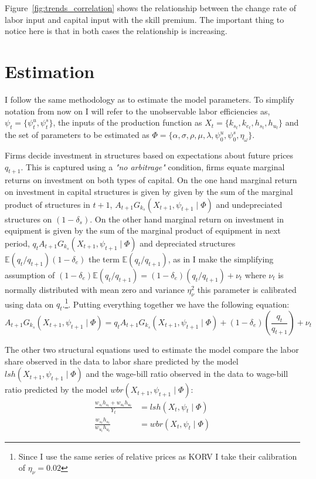 \documentclass[12pt]{article}
\begin{document}
Figure~\ref*{fig:trends_correlation} shows the relationship between the change rate of labor input and capital input with the skill premium. The important thing to notice here is that in both cases the relationship is increasing.


\section{Estimation}
I follow the same methodology as \citep{krusell2000capital} to estimate the model parameters. To simplify notation from now on I will refer to the unobservable labor efficiencies as, $\psi_t = \{\psi^u_t, \psi^s_t\}$, the inputs of the production function as $X_t = \{ k_{s_t} , k_{e_t}, h_{s_t}, h_{u_t}\}$ and the set of parameters to be estimated as $\Phi = \{\alpha, \sigma, \rho, \mu, \lambda, \psi^u_0, \psi^s_0, \eta_\omega \}$. 

Firms decide investment in structures based on expectations about future prices $q_{t+1}$. This is captured using a \textit{"no arbitrage"} condition, firms equate marginal returns on investment on both types of capital. On the one hand marginal return on investment in capital structures is given by given by the sum of the marginal product of structures in $t+1$, $A_{t+1} G_{k_s}(X_{t+1}, \psi_{t+1} \mid \Phi )$ and undepreciated structures on $(1-\delta_s)$. On the other hand marginal return on investment in equipment is given by the sum of the marginal product of equipment in next period, $q_t A_{t+1} G_{k_s}(X_{t+1}, \psi_{t+1} \mid \Phi )$ and depreciated structures $\mathbb{E}(q_t/q_{t+1})(1-\delta_e)$ the term $\mathbb{E}(q_t/q_{t+1})$, as in \citep{krusell2000capital} I make the simplifying assumption of 
$(1-\delta_e)\mathbb{E}(q_t/q_{t+1}) =(1-\delta_e)(q_t/q_{t+1}) + \nu_t$ where $\nu_t$ is normally distributed with mean zero and variance $\eta_\nu^2$ this parameter is calibrated using data on $q_t$.\footnote{Since I use the same series of relative prices as KORV I take their calibration of $\eta_\nu = 0.02$}. Putting everything together we have the following equation:
\begin{equation}\label{eq:no_arbitrage}
 A_{t+1} G_{k_s}(X_{t+1}, \psi_{t+1} \mid \Phi ) = q_t A_{t+1} G_{k_s}(X_{t+1}, \psi_{t+1} \mid \Phi ) + (1-\delta_e)\left(\frac{q_t}{q_{t+1}}\right) + \nu_t
\end{equation}

The other two structural equations used to estimate the model compare the labor share observed in the data to labor share predicted by the model $lsh(X_{t+1}, \psi_{t+1} \mid \Phi )$ and the wage-bill ratio observed in the data to wage-bill ratio predicted by the model $wbr(X_{t+1}, \psi_{t+1} \mid \Phi )$:
\begin{align}
 \frac{w_{s_t}h_{s_t} + w_{u_t}h_{u_t} }{Y_t} &= lsh(X_{t}, \psi_{t} \mid \Phi ) \label{eq:labor_share}\\
 \frac{w_{s_t}h_{s_t}}{w_{u_t}h_{u_t}} &= wbr(X_{t}, \psi_{t} \mid \Phi ) \label{eq:wage_bill_ratio}
\end{align}
\end{document}
